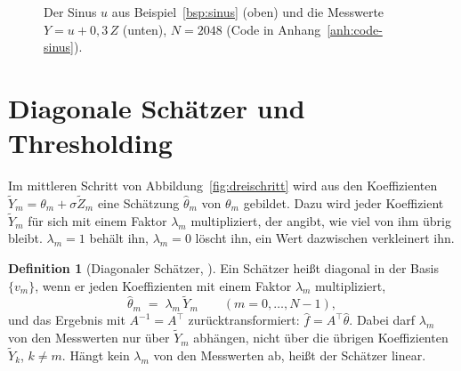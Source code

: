 \documentclass[a4paper,11pt,bibliography=totoc,listof=totoc,headinclude=true,cleardoublepage=empty,oneside]{scrbook}
\theoremstyle{plain}
\theoremstyle{definition}
\newtheorem{Definition}[Satz]{Definition}
\begin{document}
\begin{figure}[htbp]
  \centering
  \caption[Verrauschter Sinus]{Der Sinus $u$ aus Beispiel~\ref{bsp:sinus}
  (oben) und die Messwerte $Y = u + 0{,}3\,Z$ (unten), $N = 2048$
  (Code in Anhang~\ref{anh:code-sinus}).}
  \label{fig:bsp-sinus}
\end{figure}
 
\section{Diagonale Schätzer und Thresholding}
\label{sec:duennbesetztheit}
\label{sec:thresholding}
 
Im mittleren Schritt von Abbildung~\ref{fig:dreischritt} wird aus den
Koeffizienten $\tilde Y_m = \theta_m + \sigma\tilde Z_m$ eine Schätzung
$\hat\theta_m$ von $\theta_m$ gebildet. Dazu wird jeder Koeffizient
$\tilde Y_m$ für sich mit einem Faktor $\lambda_m$ multipliziert, der angibt,
wie viel von ihm übrig bleibt. $\lambda_m = 1$ behält ihn, $\lambda_m = 0$
löscht ihn, ein Wert dazwischen verkleinert ihn. 
 
\begin{Definition}[Diagonaler Schätzer, {\cite[Kap.~11.2.1, Gl.~(11.27)]{mallat}}] %
\label{def:diagonal}
Ein Schätzer hei\ss t diagonal in der Basis $\{v_m\}$, wenn er jeden
Koeffizienten mit einem Faktor $\lambda_m$ multipliziert,
\[
  \hat\theta_m \;=\; \lambda_m\,\tilde Y_m \qquad (m = 0,\dots,N-1),
\]
und das Ergebnis mit $A^{-1} = A^\top$ zurücktransformiert:
$\hat f = A^\top\hat\theta$. Dabei darf $\lambda_m$ von den Messwerten nur über
$\tilde Y_m$ abhängen, nicht über die übrigen Koeffizienten $\tilde Y_k$,
$k\neq m$. Hängt kein $\lambda_m$ von den Messwerten ab, hei\ss t der Schätzer
linear.
\end{Definition}
 
\end{document}
